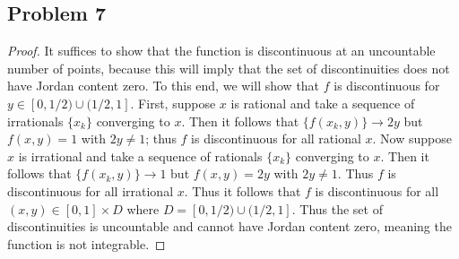 \documentclass{article}
\begin{document}
\subsection*{Problem 7}

\begin{proof}
It suffices to show that the function is discontinuous at an uncountable number of points, because this will imply that the set of discontinuities does not have Jordan content zero. To this end, we will show that $f$ is discontinuous for $y \in [0, 1/2) \cup (1/2, 1]$. First, suppose $x$ is rational and take a sequence of irrationals $\{x_k\}$ converging to $x$. Then it follows that $\{f(x_k, y)\} \to 2y$ but $f(x, y) = 1$ with $2y \neq 1$; thus $f$ is discontinuous for all rational $x$. Now suppose $x$ is irrational and take a sequence of rationals $\{x_k\}$ converging to $x$. Then it follows that $\{f(x_k, y)\} \to 1$ but $f(x, y) = 2y$ with $2y \neq 1$. Thus $f$ is discontinuous for all irrational $x$. Thus it follows that $f$ is discontinuous for all $(x, y) \in [0, 1] \times D$ where $D = [0, 1/2) \cup (1/2, 1]$. Thus the set of discontinuities is uncountable and cannot have Jordan content zero, meaning the function is not integrable. 
\end{proof}
\end{document}
